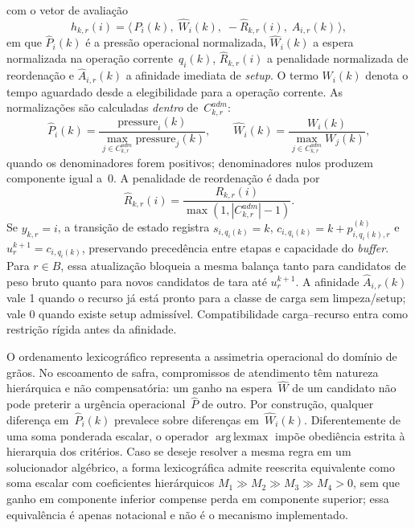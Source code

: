 \documentclass[
  12pt,
  oneside,
  a4paper,
  sumario=tradicional,
  brazil
]{abntex2}
\begin{document}
\noindent com o vetor de avalia\c{c}\~ao
\[
  h_{k,r}(i) = \big\langle\, \hat{P}_i(k),\; \hat{W}_i(k),\;
  -\hat{R}_{k,r}(i),\; \hat{A}_{i,r}(k) \,\big\rangle,
\]
em que $\hat{P}_i(k)$ \'e a press\~ao operacional normalizada, $\hat{W}_i(k)$ a espera normalizada na opera\c{c}\~ao corrente~$q_i(k)$, $\hat{R}_{k,r}(i)$ a penalidade normalizada de reordena\c{c}\~ao e $\hat{A}_{i,r}(k)$ a afinidade imediata de \emph{setup}. O termo $W_i(k)$ denota o tempo aguardado desde a elegibilidade para a opera\c{c}\~ao corrente. As normaliza\c{c}\~oes s\~ao calculadas \emph{dentro} de~$C^{adm}_{k,r}$:
\[
  \hat{P}_i(k) = \frac{\mathrm{pressure}_i(k)}
  {\max_{j \in C^{adm}_{k,r}} \mathrm{pressure}_j(k)}, \qquad
  \hat{W}_i(k) = \frac{W_i(k)}{\max_{j \in C^{adm}_{k,r}} W_j(k)},
\]
quando os denominadores forem positivos; denominadores nulos produzem componente igual a~$0$. A penalidade de reordena\c{c}\~ao \'e dada por
\[
\hat{R}_{k,r}(i)=\frac{R_{k,r}(i)}{\max(1, |C^{adm}_{k,r}|-1)}.
\]
Se $y_{k,r}=i$, a transi\c{c}\~ao de estado registra $s_{i,q_i(k)} = k$, $c_{i,q_i(k)} = k + p^{(k)}_{i,q_i(k),r}$ e $u^{k+1}_r = c_{i,q_i(k)}$, preservando preced\^encia entre etapas e capacidade do \emph{buffer}. Para $r \in B$, essa atualiza\c{c}\~ao bloqueia a mesma balan\c{c}a tanto para candidatos de peso bruto quanto para novos candidatos de tara at\'e $u^{k+1}_r$. A afinidade $\hat{A}_{i,r}(k)$ vale 1 quando o recurso j\'a est\'a pronto para a classe de carga sem limpeza/setup; vale 0 quando existe setup admiss\'ivel. Compatibilidade carga--recurso entra como restri\c{c}\~ao r\'igida antes da afinidade.

O ordenamento lexicogr\'afico representa a assimetria operacional do dom\'inio de gr\~aos. No escoamento de safra, compromissos de atendimento t\^em natureza hier\'arquica e n\~ao compensat\'oria: um ganho na espera~$\hat{W}$ de um candidato n\~ao pode preterir a urg\^encia operacional~$\hat{P}$ de outro. Por constru\c{c}\~ao, qualquer diferen\c{c}a em~$\hat{P}_i(k)$ prevalece sobre diferen\c{c}as em~$\hat{W}_i(k)$. Diferentemente de uma soma ponderada escalar, o operador $\operatorname{arg\,lexmax}$ imp\~oe obedi\^encia estrita \`a hierarquia dos crit\'erios. Caso se deseje resolver a mesma regra em um solucionador alg\'ebrico, a forma lexicogr\'afica admite reescrita equivalente como soma escalar com coeficientes hier\'arquicos $M_1 \gg M_2 \gg M_3 \gg M_4 > 0$, sem que ganho em componente inferior compense perda em componente superior; essa equival\^encia \'e apenas notacional e n\~ao \'e o mecanismo implementado.
\end{document}
